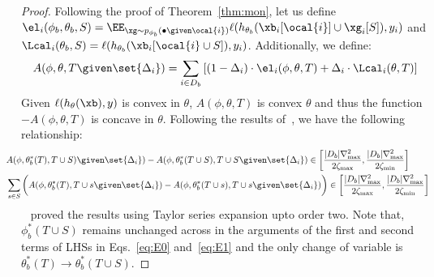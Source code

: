 \begin{proof}
Following the proof of Theorem~\ref{thm:mon},
let us define
$\el_i(\phi_b , \theta _b , S)  =  \EE_{\xg \sim p_{\phi_b} (\bullet \given     \ocal{i})} \ell(h_{\theta_b }(\xb_i[\ocal{i}] \cup \xg_i[S]) ,y_i) $ and 
$\Lcal_i(\theta _b , S )  =   \ell(h_{\theta_b }(\xb_i[\ocal{i} \cup S]),y_i ) $. Additionally, we  
define:
\begin{align}
    A(\phi,  \theta, T \given \set{\Delta_i}) =   \sum_{i\in D_b}\left[(1-\Delta_i) \cdot \el_i(\phi , \theta,T) + \Delta_i \cdot \Lcal_i (\theta,T) \right]
\end{align}
Given $\ell(h_\theta(\xb),y)$ is convex in $\theta$, 
$A (\phi,\theta,T)$ is convex $\theta$ and thus the function  $-A(\phi,\theta, T)$ is concave in $\theta$.
Following the results of~\citet[Proof of Theorem 5]{elenberg2018restricted}, we have the following relationship:
\begin{align}
& \hspace{-6mm} A( \phi,  \theta^* _b (T), T \cup S) \given \set{\Delta_i})- A(\phi,  \theta^* _b (T\cup S), T\cup S \given \set{\Delta_i})     \in \left[\frac{|D_b|\nabla_{\max} ^2}{2\zeta_{\max}},\frac{|D_b|\nabla_{\max} ^2}{2\zeta_{\min}}\right] \label{eq:E0} \\
& \hspace{-6mm} \sum_{s\in S}\bigg( A(\phi,  \theta^* _b (T), T \cup s \given \set{\Delta_i})- A(\phi,  \theta^* _b (T\cup s), T\cup s \given \set{\Delta_i})  \bigg)\in \left[\frac{|D_b|\nabla_{\max} ^2}{2\zeta_{\max}},\frac{|D_b|\nabla_{\max} ^2}{2\zeta_{\min}}\right] \label{eq:E1}
\end{align}
~\citet{elenberg2018restricted} proved the results using Taylor series expansion upto order two. Note that, $\phi_b ^* (T\cup S)$ remains unchanged across  in  the arguments of the first and second terms of LHSs  in Eqs.~\eqref{eq:E0} and~\eqref{eq:E1} and the only change of variable is $\theta _b ^* (T) \to \theta _b ^* (T\cup S)$.
 

\end{proof}
